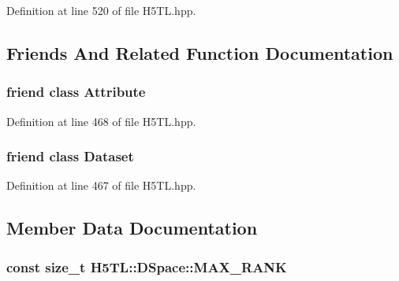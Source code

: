 Definition at line 520 of file H5\-T\-L.\-hpp.



\subsection{Friends And Related Function Documentation}
\hypertarget{class_h5_t_l_1_1_d_space_abd4bab8f7ee748d7ea63f7f9b6248611}{
\subsubsection[{Attribute}]{\setlength{\rightskip}{0pt plus 5cm}friend class {\bf Attribute}\hspace{0.3cm}{\ttfamily [friend]}}}\label{class_h5_t_l_1_1_d_space_abd4bab8f7ee748d7ea63f7f9b6248611}


Definition at line 468 of file H5\-T\-L.\-hpp.

\hypertarget{class_h5_t_l_1_1_d_space_ab93eacb81dea8d0c21041812e61f85ab}{
\subsubsection[{Dataset}]{\setlength{\rightskip}{0pt plus 5cm}friend class {\bf Dataset}\hspace{0.3cm}{\ttfamily [friend]}}}\label{class_h5_t_l_1_1_d_space_ab93eacb81dea8d0c21041812e61f85ab}


Definition at line 467 of file H5\-T\-L.\-hpp.



\subsection{Member Data Documentation}
\hypertarget{class_h5_t_l_1_1_d_space_aaff3fd7254edf581676b4d0a5740b80e}{
\subsubsection[{M\-A\-X\-\_\-\-R\-A\-N\-K}]{\setlength{\rightskip}{0pt plus 5cm}const size\-\_\-t H5\-T\-L\-::\-D\-Space\-::\-M\-A\-X\-\_\-\-R\-A\-N\-K\hspace{0.3cm}{\ttfamily [static]}}}\label{class_h5_t_l_1_1_d_space_aaff3fd7254edf581676b4d0a5740b80e}


